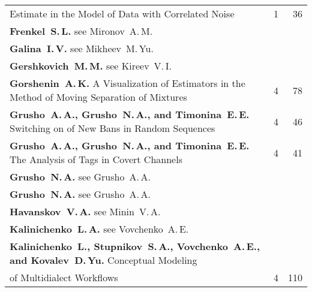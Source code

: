 {\begin{tabular}{p{399pt}rr}
\hspace*{23pt}Estimate in the Model of Data with Correlated Noise\dotfill&1&36\\
\textbf{Frenkel~S.\,L.} see Mironov~A.\,M.&&\\
\textbf{Galina~I.\,V.} see Mikheev~M.\,Yu.&&\\
\textbf{Gershkovich~M.\,M.} see Kireev~V.\,I.&&\\
\textbf{Gorshenin~A.\,K.} A Visualization of Estimators in the Method of Moving Separation of
Mixtures\dotfill&4&78\\
\textbf{Grusho~A.\,A., Grusho~N.\,A., and Timonina~E.\,E.} Switching on of New Bans in
Random Sequences\dotfill&4&46\\
\textbf{Grusho~A.\,A., Grusho~N.\,A., and Timonina~E.\,E.} The Analysis of Tags in Covert
Channels\dotfill&4&41\\
\textbf{Grusho~N.\,A.} see Grusho~A.\,A.&&\\
\textbf{Grusho~N.\,A.} see Grusho~A.\,A.&&\\
\textbf{Havanskov~V.\,A.} see Minin~V.\,A.&&\\
\textbf{Kalinichenko~L.\,A.} see Vovchenko~A.\,E.&&\\
\textbf{Kalinichenko~L., Stupnikov~S.\,A., Vovchenko~A.\,E., and Kovalev~D.\,Yu.}
Conceptual Modeling\linebreak
\vspace*{-12pt}\\
\hspace*{23pt}of Multidialect Workflows\dotfill&4&110\\
\end{tabular}
}
\pagebreak

\def\leftfootline{\small{\textbf{\thepage}
\hfill INFORMATIKA I EE PRIMENENIYA~--- INFORMATICS AND APPLICATIONS\ \ \ 2014\
\ \ volume~8\ \ \ issue\ 4}
}%
 \def\rightfootline{\small{INFORMATIKA I EE PRIMENENIYA~---
INFORMATICS AND APPLICATIONS\ \ \ 2014\ \ \ volume~8\ \ \ issue\ 4
\hfill \textbf{\thepage}}}

\def\leftkol{2014 AUTHOR INDEX} %

\def\rightkol{2014 AUTHOR INDEX} %



